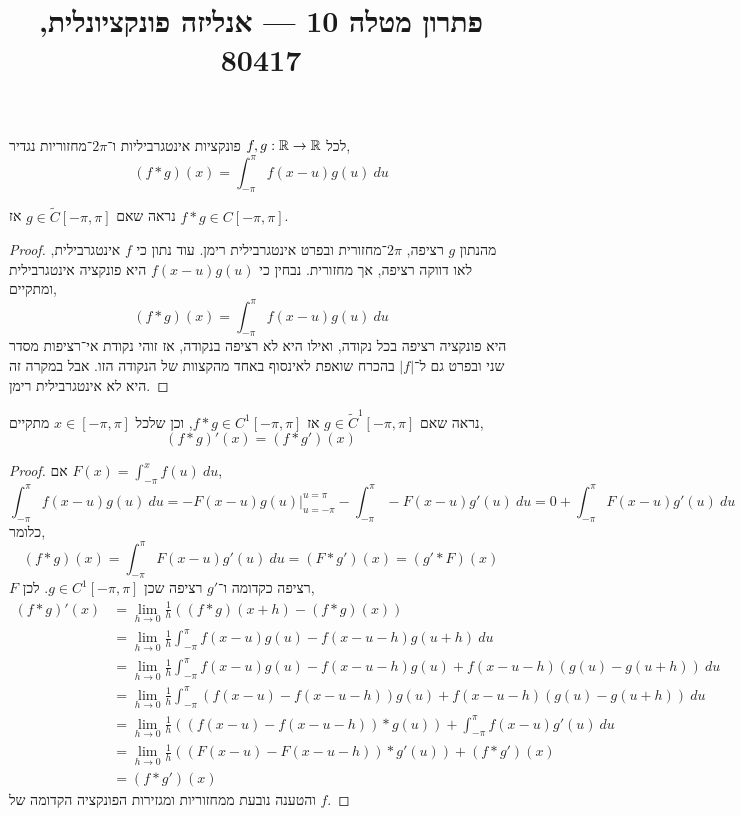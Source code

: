 
\title{פתרון מטלה 10 --- אנליזה פונקציונלית, 80417}

\DeclareMathOperator\sgn{sgn}


\maketitle
\maketitleprint[teal]

\question{}
לכל $f, g : \mathbb{R} \to \mathbb{R}$ פונקציות אינטגרביליות ו־$2 \pi$־מחזוריות נגדיר,
\[
	(f * g)(x)
	= \int_{-\pi}^{\pi} f(x - u) g(u)\ du
\]

\subquestion{}
נראה שאם $g \in \tilde{C}[-\pi, \pi]$ אז $f * g \in C[-\pi, \pi]$.
\begin{proof}
	מהנתון $g$ רציפה, $2 \pi$־מחזורית ובפרט אינטגרבילית רימן.
	עוד נתון כי $f$ אינטגרבילית, לאו דווקה רציפה, אך מחזורית.
	נבחין כי $f(x - u) g(u)$ היא פונקציה אינטגרבילית ומתקיים,
	\[
		(f * g)(x)
		= \int_{-\pi}^{\pi} f(x - u) g(u)\ du
	\]
	היא פונקציה רציפה בכל נקודה, ואילו היא לא רציפה בנקודה, אז זוהי נקודת אי־רציפות מסדר שני ובפרט גם ל־$|f|$ בהכרח שואפת לאינסוף באחד מהקצוות של הנקודה הזו.
	אבל במקרה זה היא לא אינטגרבילית רימן.
\end{proof}

\subquestion{}
נראה שאם $g \in \tilde{C}^1[-\pi, \pi]$ אז $f * g \in C^1[-\pi, \pi]$,
וכן שלכל $x \in [-\pi, \pi]$ מתקיים,
\[
	(f * g)'(x)
	= (f * g')(x)
\]
\begin{proof}
	אם $F(x) = \int_{-\pi}^{x} f(u)\ du$,
	\[
		\int_{-\pi}^{\pi} f(x - u) g(u)\ du
		= \left. -F(x - u) g(u) \right\lvert_{u = -\pi}^{u = \pi} - \int_{-\pi}^{\pi} -F(x - u) g'(u)\ du
		= 0 + \int_{-\pi}^{\pi} F(x - u) g'(u)\ du
	\]
	כלומר,
	\[
		(f * g)(x)
		= \int_{-\pi}^{\pi} F(x - u) g'(u)\ du
		= (F * g')(x)
		= (g' * F)(x)
	\]
	$F$ רציפה כקדומה ו־$g'$ רציפה שכן $g \in C^1[-\pi, \pi]$.
	לכן,
	\begin{align*}
		(f * g)'(x)
		& = \lim_{h \to 0} \frac{1}{h} ((f * g)(x + h) - (f * g)(x)) \\
		& = \lim_{h \to 0} \frac{1}{h} \int_{-\pi}^{\pi} f(x - u) g(u) - f(x - u - h) g(u + h)\ du \\
		& = \lim_{h \to 0} \frac{1}{h} \int_{-\pi}^{\pi} f(x - u) g(u) - f(x - u - h) g(u) + f(x - u - h)( g(u) - g(u + h))\ du \\
		& = \lim_{h \to 0} \frac{1}{h} \int_{-\pi}^{\pi} (f(x - u) - f(x - u - h)) g(u) + f(x - u - h)( g(u) - g(u + h))\ du \\
		& = \lim_{h \to 0} \frac{1}{h} ((f(x - u) - f(x - u - h)) * g(u)) + \int_{-\pi}^{\pi} f(x - u) g'(u)\ du \\
		& = \lim_{h \to 0} \frac{1}{h} ((F(x - u) - F(x - u - h)) * g'(u)) + (f * g')(x) \\
		& = (f * g')(x)
	\end{align*}
	והטענה נובעת ממחזוריות ומגזירות הפונקציה הקדומה של $f$.
\end{proof}


